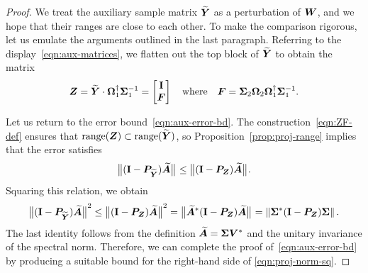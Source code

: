 \documentclass[final]{siamltex}
\begin{document}
\begin{proof}




We treat the auxiliary sample matrix $\widetilde{\bm{Y}}$ as a perturbation of $\bm{W}$, and we hope that their ranges are close to each other.  To make the comparison rigorous, let us emulate the arguments outlined in the last paragraph.
Referring to the display~\eqref{eqn:aux-matrices}, we flatten out the top block of $\widetilde{\bm{Y}}$ to obtain the matrix
\begin{equation} \label{eqn:ZF-def}
\mtx{Z} = \widetilde{\mtx{Y}} \cdot \mtx{\Omega}_1^\psinv \mtx{\Sigma}_1^{-1}
	= \begin{bmatrix} \Id \\ \mtx{F} \end{bmatrix}
\quad\text{where}\quad
\mtx{F} = \mtx{\Sigma}_2 \mtx{\Omega}_2 \mtx{\Omega}_1^\psinv \mtx{\Sigma}_1^{-1}.
\end{equation}

Let us return to the error bound~\eqref{eqn:aux-error-bd}.  The construction~\eqref{eqn:ZF-def} ensures that $\operatorname{range}(\bm{Z}) \subset \operatorname{range}(\widetilde{\bm{Y}})$, so Proposition~\ref{prop:proj-range} implies that the error satisfies
$$
{\bigl\Vert { (\mathbf{I}- \bm{P}_{\widetilde{\bm{Y}}}) \widetilde{\bm{A}} } \bigr\Vert}_{}
	\leq {\bigl\Vert { (\mathbf{I}- \bm{P}_{\bm{Z}}) \widetilde{\bm{A}} } \bigr\Vert}_{}.
$$
Squaring this relation, we obtain
\begin{equation} \label{eqn:proj-norm-sq}
\smnorm{}{(\Id - \mtx{P}_{\widetilde{\mtx{Y}}}) \widetilde{\mtx{A}}}^2
    \leq \smnorm{}{(\Id - \mtx{P}_{\mtx{Z}})\widetilde{\mtx{A}}}^2
    = \smnorm{}{ \widetilde{\mtx{A}}^\adj (\Id - \mtx{P}_{\mtx{Z}}) \widetilde{\mtx{A}} }
    = \norm{ \mtx{\Sigma}^\adj (\Id - \mtx{P}_{\mtx{Z}}) \mtx{\Sigma} }.
\end{equation}
The last identity follows from the definition $\widetilde{\bm{A}} = \bm{\Sigma} \bm{V}^*$ and the unitary invariance of the spectral norm.  Therefore, we can complete the proof of~\eqref{eqn:aux-error-bd} by producing a suitable bound for the right-hand side of \eqref{eqn:proj-norm-sq}.



\end{proof}
\end{document}
